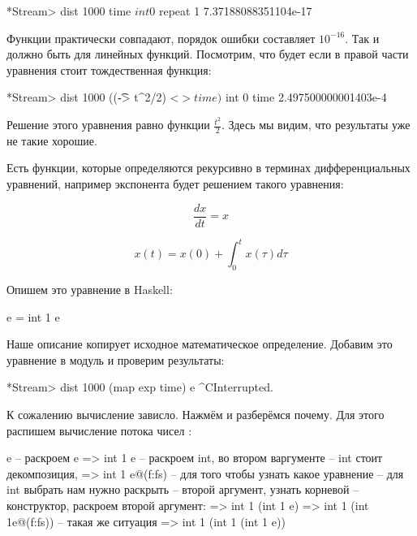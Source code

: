 \begin{code}
*Stream> dist 1000 time $ int 0 $ repeat 1
7.37188088351104e-17
\end{code}

Функции практически совпадают, порядок ошибки составляет $10^{-16}$. Так
и должно быть для линейных функций. Посмотрим, что будет если в правой
части уравнения стоит тождественная функция:


\begin{code}
*Stream> dist 1000 ((\t -> t^2/2) <$> time) $ int 0 time
2.497500000001403e-4
\end{code}

Решение этого уравнения равно функции $\frac{t^2}{2}$. Здесь мы видим,
что результаты уже не такие хорошие.

Есть функции, которые определяются рекурсивно в терминах
дифференциальных уравнений, например экспонента будет решением такого
уравнения:

\[\frac{dx}{dt} = x\]

\[x(t) = x(0) + \int_{0}^{t} x(\tau) d \tau\]

Опишем это уравнение в Haskell:


\begin{code}
e = int 1 e
\end{code}

Наше описание копирует исходное математическое определение. Добавим это
уравнение в модуль  и проверим результаты:


\begin{code}
*Stream> dist 1000 (map exp time) e
^CInterrupted.
\end{code}

К сожалению вычисление зависло. Нажмём  и разберёмся почему.
Для этого распишем вычисление потока чисел :


\begin{code}
        e                           -- раскроем e 
=>      int 1 e                     -- раскроем int, во втором варгументе
                                    -- int стоит декомпозиция, 
=>      int 1 e@(f:fs)              -- для того чтобы узнать какое уравнение 
                                    -- для int выбрать нам нужно раскрыть 
                                    -- второй аргумент, узнать корневой 
                                    -- конструктор, раскроем второй аргумент:
=>      int 1 (int 1 e)
=>      int 1 (int 1e@(f:fs))       -- такая же ситуация
=>      int 1 (int 1 (int 1 e))
\end{code}


